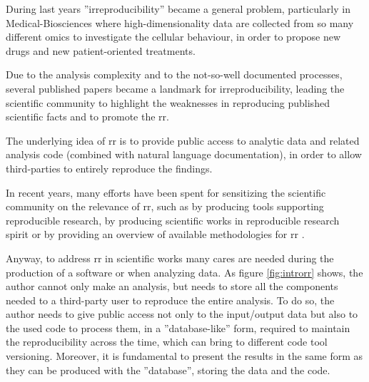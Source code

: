 During last years ''irreproducibility'' became a general problem, particularly in Medical-Biosciences where high-dimensionality data are collected from so many different omics to investigate the cellular behaviour, in order to propose new drugs and new patient-oriented treatments.

Due to the analysis complexity and to the not-so-well documented processes, several published papers \cite{Baggerly2009, Potti2011} became a landmark for irreproducibility, leading the scientific community to highlight the weaknesses in reproducing published scientific facts and to promote the \gls{rr}.

The underlying idea of \gls{rr} \cite{Fomel2009b} is to provide public access to analytic data and related analysis code (combined with natural language documentation), in order to allow third-parties to entirely reproduce the findings.

In recent years, many efforts have been spent for sensitizing the scientific community on the relevance of \gls{rr}, such as by producing tools \cite{RussoRighelli2016} supporting reproducible research, by producing scientific works in reproducible research spirit \cite{CostaRighelli2017} or by providing an overview of available methodologies for \gls{rr} \cite{russo2015advantages}.

Anyway, to address \gls{rr} in scientific works many cares are needed during the production of a software or when analyzing data.
As figure \ref{fig:introrr} \cite{Peng2009} shows, the author cannot only make an analysis, but needs to store all the components needed to a third-party user to reproduce the entire analysis.
To do so, the author needs to give public access not only to the input/output data but also to the used code to process them, in a ''database-like'' form, required to maintain the reproducibility across the time, which can bring to different code tool versioning.
Moreover, it is fundamental to present the results in the same form as they can be produced with the ''database'', storing the data and the code.


